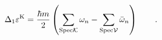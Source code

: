 \begin{equation}
\Delta_1\varepsilon^{\rm K}=\frac{\hbar m}{2}\left(\sum_{{\rm
Spec}{\cal K}}\omega_n-\sum_{{\rm Spec}{\cal V}}{\bar\omega}_n\right)
\label{eq:cas} \qquad .
\end{equation}

